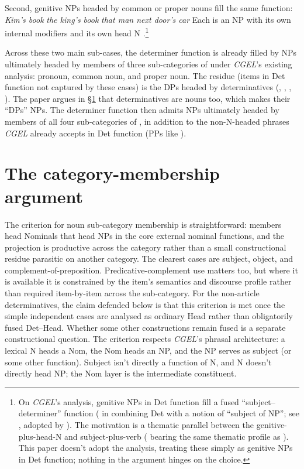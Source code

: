 \documentclass[12pt]{article}
\begin{document}
Second, genitive NPs headed by common or proper nouns fill the same function:
\ea\label{ex:gen-NPs}
\ea \textit{Kim's book}
\ex \textit{the king's book}
\ex \textit{that man next door's car}
\z
\z
Each is an NP with its own internal modifiers and its own head N \citep[2]{pullummiller2022nps}.\footnote{On \textit{CGEL}'s analysis, genitive NPs in Det function fill a fused \enquote{subject--determiner} function ( in  combining Det with a notion of \enquote{subject of NP}; see \textcite[Ch.~16 §5]{huddleston2002}, adopted by \textcite{Payne2007}). The motivation is a thematic parallel between the genitive-plus-head-N and subject-plus-verb ( bearing the same thematic profile as ). This paper doesn't adopt the analysis, treating these simply as genitive NPs in Det function; nothing in the argument hinges on the choice.}

Across these two main sub-cases, the determiner function is already filled by NPs ultimately headed by members of three sub-categories of  under \textit{CGEL}'s existing analysis: pronoun, common noun, and proper noun. The residue (items in Det function not captured by these cases) is the DPs headed by determinatives (, , , ). The paper argues in §\ref{sec:argument} that determinatives are nouns too, which makes their \enquote{DPs} NPs. The determiner function then admits NPs ultimately headed by members of all four sub-categories of , in addition to the non-N-headed phrases \textit{CGEL} already accepts in Det function (PPs like ).

\section{The category-membership argument}\label{sec:argument}

The criterion for noun sub-category membership is straightforward: members head Nominals that head NPs in the core external nominal functions, and the projection is productive across the category rather than a small constructional residue parasitic on another category. The clearest cases are subject, object, and complement-of-preposition. Predicative-complement use matters too, but where it is available it is constrained by the item's semantics and discourse profile rather than required item-by-item across the sub-category. For the non-article determinatives, the claim defended below is that this criterion is met once the simple independent cases are analysed as ordinary Head rather than obligatorily fused Det--Head. Whether some other constructions remain fused is a separate constructional question. The criterion respects \textit{CGEL}'s phrasal architecture: a lexical N heads a Nom, the Nom heads an NP, and the NP serves as subject (or some other function). Subject isn't directly a function of N, and N doesn't directly head NP; the Nom layer is the intermediate constituent.
\end{document}
